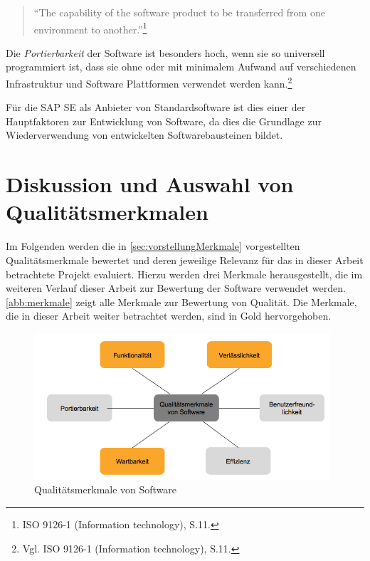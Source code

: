             \begin{quote}
              \enquote{The capability of the software product to be transferred from one environment to another.}\footnote{ISO 9126-1 (Information technology), S.11.}
            \end{quote}

            Die \emph{Portierbarkeit} der Software ist besonders hoch, wenn sie so universell programmiert ist, dass sie ohne oder mit minimalem Aufwand auf verschiedenen Infrastruktur und Software Plattformen verwendet werden kann.\footnote{Vgl. ISO 9126-1 (Information technology), S.11.}

            Für die SAP SE als Anbieter von Standardsoftware ist dies einer der Hauptfaktoren zur Entwicklung von Software, da dies die Grundlage zur Wiederverwendung von entwickelten Softwarebausteinen bildet.

%
%

    \section{Diskussion und Auswahl von Qualitätsmerkmalen}
    \label{sec:diskussionMerkmale}

        Im Folgenden werden die in \autoref{sec:vorstellungMerkmale} vorgestellten Qualitätsmerkmale bewertet und deren jeweilige Relevanz für das in dieser Arbeit betrachtete Projekt evaluiert. Hierzu werden drei Merkmale herausgestellt, die im weiteren Verlauf dieser Arbeit zur Bewertung der Software verwendet werden. \autoref{abb:merkmale} zeigt alle Merkmale zur Bewertung von Qualität. Die Merkmale, die in dieser Arbeit weiter betrachtet werden, sind in Gold hervorgehoben.

        \begin{figure}[!htbp]
                \begin{center}
                    \includegraphics[width=11cm]{Abbildungen/merkmale}
                    \caption[Qualitätsmerkmale von Software]{Qualitätsmerkmale von Software}
                    \label{abb:merkmale}
                \end{center}
        \end{figure}

